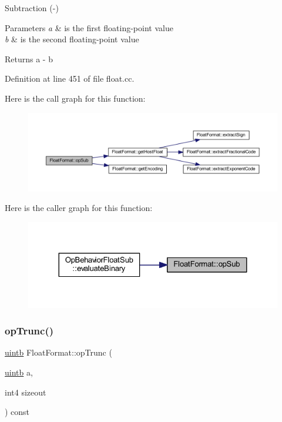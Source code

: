 Subtraction (-\/) 


\begin{DoxyParams}{Parameters}
{\em a} & is the first floating-\/point value \\
\hline
{\em b} & is the second floating-\/point value \\
\hline
\end{DoxyParams}
\begin{DoxyReturn}{Returns}
a -\/ b 
\end{DoxyReturn}


Definition at line 451 of file float.\+cc.

Here is the call graph for this function\+:
\nopagebreak
\begin{figure}[H]
\begin{center}
\leavevmode
\includegraphics[width=350pt]{class_float_format_affc23eaa38dae2db40e8e16c9cf9c821_cgraph}
\end{center}
\end{figure}
Here is the caller graph for this function\+:
\nopagebreak
\begin{figure}[H]
\begin{center}
\leavevmode
\includegraphics[width=324pt]{class_float_format_affc23eaa38dae2db40e8e16c9cf9c821_icgraph}
\end{center}
\end{figure}
\mbox{\label{class_float_format_a97577950c7ef0b53099d17deee29f198}} 
\subsubsection{\texorpdfstring{opTrunc()}{opTrunc()}}
{\footnotesize\ttfamily \mbox{\hyperlink{types_8h_a2db313c5d32a12b01d26ac9b3bca178f}{uintb}} Float\+Format\+::op\+Trunc (\begin{DoxyParamCaption}\item[{\mbox{\hyperlink{types_8h_a2db313c5d32a12b01d26ac9b3bca178f}{uintb}}}]{a,  }\item[{int4}]{sizeout }\end{DoxyParamCaption}) const}



